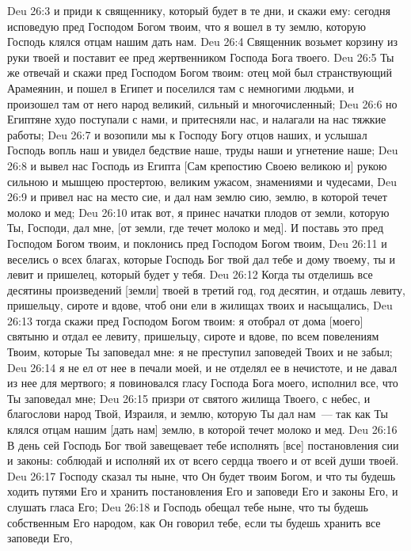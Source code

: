 \vs Deu 26:3 и приди к священнику, который будет в те дни, и скажи ему: сегодня исповедую пред Господом Богом твоим, что я вошел в ту землю, которую Господь клялся отцам нашим дать нам.
\vs Deu 26:4 Священник возьмет корзину из руки твоей и поставит ее пред жертвенником Господа Бога твоего.
\vs Deu 26:5 Ты же отвечай и скажи пред Господом Богом твоим: отец мой был странствующий Арамеянин, и пошел в Египет и поселился там с немногими людьми, и произошел там от него народ великий, сильный и многочисленный;
\vs Deu 26:6 но Египтяне худо поступали с нами, и притесняли нас, и налагали на нас тяжкие работы;
\vs Deu 26:7 и возопили мы к Господу Богу отцов наших, и услышал Господь вопль наш и увидел бедствие наше, труды наши и угнетение наше;
\vs Deu 26:8 и вывел нас Господь из Египта [Сам крепостию Своею великою и] рукою сильною и мышцею простертою, великим ужасом, знамениями и чудесами,
\vs Deu 26:9 и привел нас на место сие, и дал нам землю сию, землю, в которой течет молоко и мед;
\vs Deu 26:10 итак вот, я принес начатки плодов от земли, которую Ты, Господи, дал мне, [от земли, где течет молоко и мед]. И поставь это пред Господом Богом твоим, и поклонись пред Господом Богом твоим,
\vs Deu 26:11 и веселись о всех благах, которые Господь Бог твой дал тебе и дому твоему, ты и левит и пришелец, который будет у тебя.
\vs Deu 26:12 Когда ты отделишь все десятины произведений [земли] твоей в третий год, год десятин, и отдашь левиту, пришельцу, сироте и вдове, чтоб они ели в жилищах твоих и насыщались,
\vs Deu 26:13 тогда скажи пред Господом Богом твоим: я отобрал от дома [моего] святыню и отдал ее левиту, пришельцу, сироте и вдове, по всем повелениям Твоим, которые Ты заповедал мне: я не преступил заповедей Твоих и не забыл;
\vs Deu 26:14 я не ел от нее в печали моей, и не отделял ее в нечистоте, и не давал из нее для мертвого; я повиновался гласу Господа Бога моего, исполнил все, что Ты заповедал мне;
\vs Deu 26:15 призри от святого жилища Твоего, с небес, и благослови народ Твой, Израиля, и землю, которую Ты дал нам~--- так как Ты клялся отцам нашим [дать нам] землю, в которой течет молоко и мед.
\vs Deu 26:16 В день сей Господь Бог твой завещевает тебе исполнять [все] постановления сии и законы: соблюдай и исполняй их от всего сердца твоего и от всей души твоей.
\vs Deu 26:17 Господу сказал ты ныне, что Он будет твоим Богом, и что ты будешь ходить путями Его и хранить постановления Его и заповеди Его и законы Его, и слушать гласа Его;
\vs Deu 26:18 и Господь обещал тебе ныне, что ты будешь собственным Его народом, как Он говорил тебе, если ты будешь хранить все заповеди Его,
